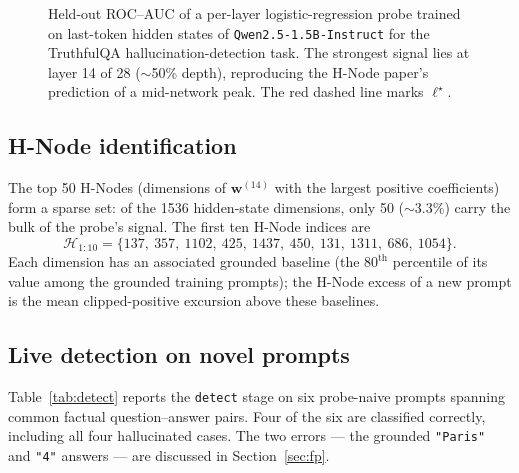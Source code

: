\documentclass[11pt]{article}
\begin{document}
\begin{figure}[h]
\centering
{}
\caption{Held-out ROC--AUC of a per-layer logistic-regression probe trained on last-token
hidden states of \texttt{Qwen2.5-1.5B-Instruct} for the TruthfulQA hallucination-detection
task. The strongest signal lies at layer 14 of 28 ($\sim$50\% depth), reproducing the
H-Node paper's prediction of a mid-network peak. The red dashed line marks $\ell^\star$.}
\label{fig:auc}
\end{figure}

\subsection{H-Node identification}
The top 50 H-Nodes (dimensions of $\mathbf{w}^{(14)}$ with the largest positive coefficients)
form a sparse set: of the 1536 hidden-state dimensions, only 50 ($\sim$3.3\%) carry the bulk
of the probe's signal. The first ten H-Node indices are
\[
\mathcal{H}_{1:10} = \{137,\ 357,\ 1102,\ 425,\ 1437,\ 450,\ 131,\ 1311,\ 686,\ 1054\}.
\]
Each dimension has an associated grounded baseline (the $80^{\text{th}}$ percentile of its
value among the grounded training prompts); the H-Node excess of a new prompt is the mean
clipped-positive excursion above these baselines.

\subsection{Live detection on novel prompts}
Table~\ref{tab:detect} reports the \texttt{detect} stage on six probe-naive prompts spanning
common factual question--answer pairs. Four of the six are classified correctly, including
all four hallucinated cases. The two errors --- the grounded \texttt{"Paris"} and
\texttt{"4"} answers --- are discussed in Section~\ref{sec:fp}.
\end{document}
